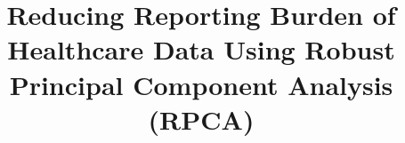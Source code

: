 \documentclass[conference]{IEEEtran}
\begin{document}
\title{Reducing Reporting Burden of Healthcare Data Using Robust Principal Component Analysis (RPCA)}



\maketitle

\thispagestyle{plain}
\pagestyle{plain}
\end{document}
